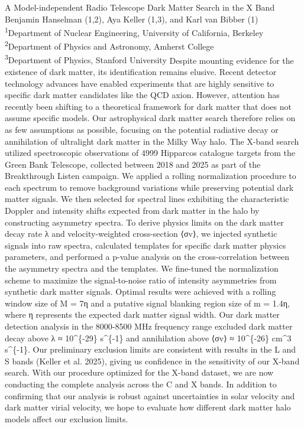 \makeabstract
{
A Model-independent Radio Telescope Dark Matter Search in the X Band
}
{
Benjamin Hanselman (1,2), Aya Keller (1,3), and Karl van Bibber (1)
}
{
\textsuperscript{1}Department of Nuclear Engineering, University of California, Berkeley\\
\textsuperscript{2}Department of Physics and Astronomy, Amherst College\\
\textsuperscript{3}Department of Physics, Stanford University
}
{
Despite mounting evidence for the existence of dark matter, its identification remains elusive. Recent detector technology advances have enabled experiments that are highly sensitive to specific dark matter candidates like the QCD axion. However, attention has recently been shifting to a theoretical framework for dark matter that does not assume specific models. Our astrophysical dark matter search therefore relies on as few assumptions as possible, focusing on the potential radiative decay or annihilation of ultralight dark matter in the Milky Way halo.
}
{
The X-band search utilized spectroscopic observations of 4999 Hipparcos catalogue targets from the Green Bank Telescope, collected between 2018 and 2025 as part of the Breakthrough Listen campaign. We applied a rolling normalization procedure to each spectrum to remove background variations while preserving potential dark matter signals. We then selected for spectral lines exhibiting the characteristic Doppler and intensity shifts expected from dark matter in the halo by constructing asymmetry spectra. To derive physics limits on the dark matter decay rate λ and velocity-weighted cross-section ⟨σv⟩, we injected synthetic signals into raw spectra, calculated templates for specific dark matter physics parameters, and performed a p-value analysis on the cross-correlation between the asymmetry spectra and the templates.
}
{
We fine-tuned the normalization scheme to maximize the signal-to-noise ratio of intensity asymmetries from synthetic dark matter signals. Optimal results were achieved with a rolling window size of M = 7η and a putative signal blanking region size of m = 1.4η, where η represents the expected dark matter signal width. Our dark matter detection analysis in the 8000-8500 MHz frequency range excluded dark matter decay above λ ≈ 10\textasciicircum{}\{-29\} s\textasciicircum{}\{-1\} and annihilation above ⟨σv⟩ ≈ 10\textasciicircum{}\{-26\} cm\textasciicircum{}3 s\textasciicircum{}\{-1\}.
}
{
Our preliminary exclusion limits are consistent with results in the L and S bands (Keller et al. 2025), giving us confidence in the sensitivity of our X-band search. With our procedure optimized for the X-band dataset, we are now conducting the complete analysis across the C and X bands. In addition to confirming that our analysis is robust against uncertainties in solar velocity and dark matter virial velocity, we hope to evaluate how different dark matter halo models affect our exclusion limits.
}

\newpage
